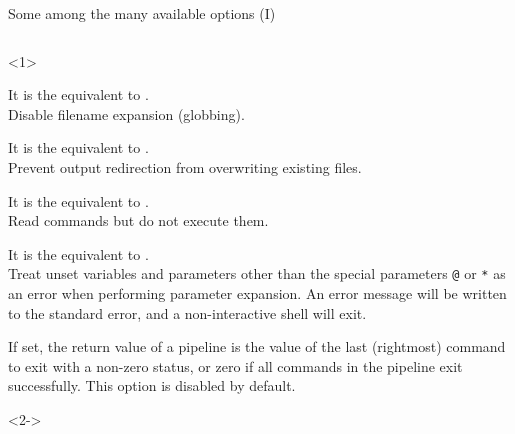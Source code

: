 \begin{frame}{Some among the many available options (I)}
    \vspace{-6mm}
    \begin{columns}
        \begin{column}{\dimexpr\paperwidth-10mm}
            \begin{onlyenv}<1>
                \begin{description}
                    \setlength{\itemsep}{3mm}
                    \item[\PB{\texttt{-o noglob}}]
                        It is the equivalent to .\\
                        Disable filename expansion (globbing).
                    \item[\PB{\texttt{-o noclobber}}]
                        It is the equivalent to .\\
                        Prevent output redirection from overwriting existing files.
                    \item[\PB{\texttt{-o noexec}}]
                        It is the equivalent to .\\
                        Read commands but do not execute them. 
                    \item[\PB{\texttt{-o nounset}}]
                        It is the equivalent to .\\
                        Treat unset variables and parameters other than the special parameters \texttt{@} or \texttt{*} as an error when performing parameter expansion.
                        An error message will be written to the standard error, and a non-interactive shell will exit.
                    \item[\PB{\texttt{-o pipefail}}]
                        If set, the return value of a pipeline is the value of the last (rightmost) command to exit with a non-zero status, or zero if all commands in the pipeline exit successfully.
                        This option is disabled by default.
                \end{description}
            \end{onlyenv}
            \begin{onlyenv}<2->
                \begin{description}
                    \item[\PB{\texttt{-o errexit}}]

\end{description}
\end{onlyenv}
\end{column}
\end{columns}
\end{frame}

